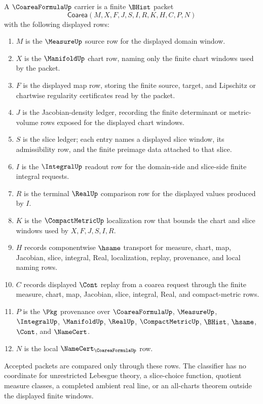 \begin{definition}
\label{def:coarea-formula-carrier}
A $\CoareaFormulaUp$ carrier is a finite $\BHist$ packet
$$
\mathsf{Coarea}(M,X,F,J,S,I,R,K,H,C,P,N)
$$
with the following displayed rows:
\begin{enumerate}
\item $M$ is the $\MeasureUp$ source row for the displayed domain window.
\item $X$ is the $\ManifoldUp$ chart row, naming only the finite chart windows used by the packet.
\item $F$ is the displayed map row, storing the finite source, target, and Lipschitz or chartwise regularity certificates read by the packet.
\item $J$ is the Jacobian-density ledger, recording the finite determinant or metric-volume rows exposed for the displayed chart windows.
\item $S$ is the slice ledger; each entry names a displayed slice window, its admissibility row, and the finite preimage data attached to that slice.
\item $I$ is the $\IntegralUp$ readout row for the domain-side and slice-side finite integral requests.
\item $R$ is the terminal $\RealUp$ comparison row for the displayed values produced by $I$.
\item $K$ is the $\CompactMetricUp$ localization row that bounds the chart and slice windows used by $X,F,J,S,I,R$.
\item $H$ records componentwise $\hsame$ transport for measure, chart, map, Jacobian, slice, integral, Real, localization, replay, provenance, and local naming rows.
\item $C$ records displayed $\Cont$ replay from a coarea request through the finite measure, chart, map, Jacobian, slice, integral, Real, and compact-metric rows.
\item $P$ is the $\Pkg$ provenance over $\CoareaFormulaUp$, $\MeasureUp$, $\IntegralUp$, $\ManifoldUp$, $\RealUp$, $\CompactMetricUp$, $\BHist$, $\hsame$, $\Cont$, and $\NameCert$.
\item $N$ is the local $\NameCert_{\CoareaFormulaUp}$ row.
\end{enumerate}
Accepted packets are compared only through these rows. The classifier has no coordinate for unrestricted Lebesgue theory, a slice-choice function, quotient measure classes, a completed ambient real line, or an all-charts theorem outside the displayed finite windows.
\end{definition}

